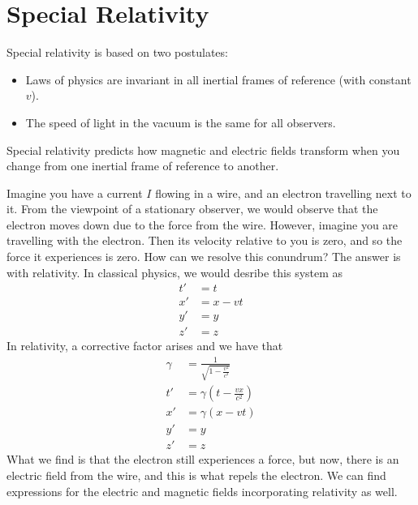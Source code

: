 \documentclass[nobib]{tufte-handout}
\begin{document}
\section{Special Relativity}
Special relativity is based on two
postulates:
\begin{itemize}
    \item Laws of physics are invariant in all
    inertial frames of reference (with constant $v$).
    \item The speed of light in the vacuum is the same
    for all observers.
\end{itemize}

Special relativity predicts how magnetic and electric 
fields transform when you change from one inertial frame of 
reference to another.

Imagine you have a current $I$ flowing in a wire, and an electron 
travelling next to it. From the viewpoint of a stationary observer, 
we would observe that the electron moves down due to the force from 
the wire. However, imagine you are travelling with the electron. Then 
its velocity relative to you is zero, and so the force it experiences is 
zero. How can we resolve this conundrum? The answer is with relativity. 
In classical physics, we would desribe this system as 
\begin{align*}
    t' &= t \\
    x' &= x - vt \\
    y' &= y \\
    z' &= z
\end{align*}
In relativity, a corrective factor arises and we have that
\begin{align*}
    \gamma &= \frac{1}{\sqrt{1 - \frac{v^2}{c^2}}} \\
    t' &= \gamma \left(t - \frac{vx}{c^2}\right) \\
    x' &= \gamma (x - vt) \\
    y' &= y \\
    z' &= z
\end{align*}
What we find is that the electron still experiences a force, 
but now, there is an electric field from the wire, and this is 
what repels the electron. We can find expressions for the electric 
and magnetic fields incorporating relativity as well. 
\end{document}
